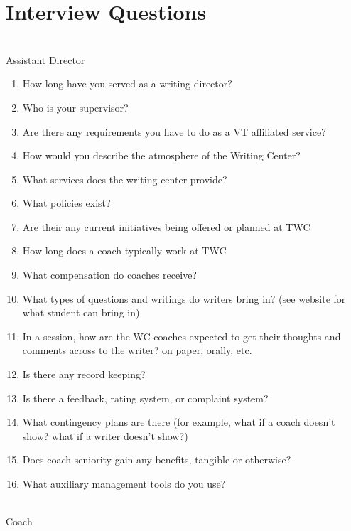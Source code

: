 \documentclass[12pt]{article} %
\begin{document}
\section{Interview Questions}
\begin{tabbing}
\\
Assistant Director \\
\end{tabbing}
\begin{enumerate} \itemsep1pt \parskip0pt 
	\item How long have you served as a writing director?
	\item Who is your supervisor?
	\item Are there any requirements you have to do as a VT affiliated service?
	\item How would you describe the atmosphere of the Writing Center?
	\item What services does the writing center provide?
	\item What policies exist?
	\item Are their any current initiatives being offered or planned at TWC
	\item How long does a coach typically work at TWC 
	\item What compensation do coaches receive?
	\item What types of questions and writings do writers bring in? (see website for what student can bring in)
	\item In a session, how are the WC coaches expected to get their thoughts and comments across to the writer? {on paper, orally, etc.}
	\item Is there any record keeping?
	\item Is there a feedback, rating system, or complaint system?
	\item What contingency plans are there (for example, what if a coach doesn’t show?  what if a writer doesn’t show?)
	\item Does coach seniority gain any benefits, tangible or otherwise?
	\item What auxiliary management tools do you use?
\end{enumerate}
\begin{tabbing}
\\
Coach \\
\end{tabbing}
\end{document}
